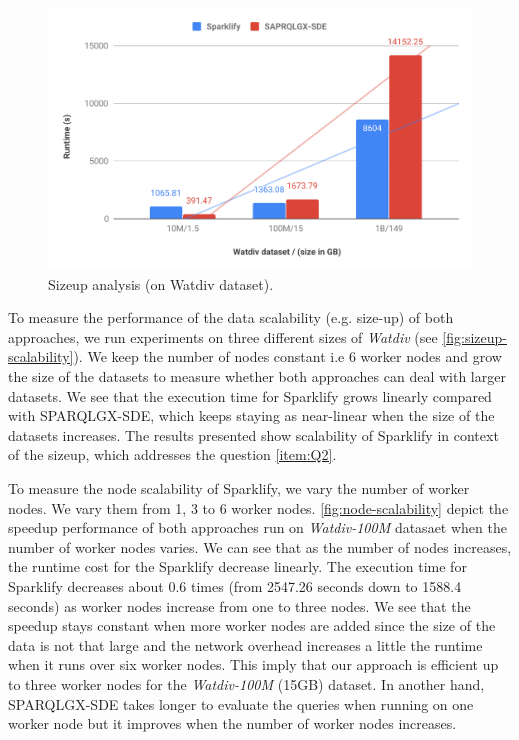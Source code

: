 \begin{figure}
 \includegraphics[width=1.0\columnwidth]{images/sizeup-scalability.pdf}
    \caption{Sizeup analysis (on Watdiv dataset).}
    \label{fig:sizeup-scalability}
\end{figure}

To measure the performance of the data scalability (e.g. size-up) of both approaches, we run experiments on three different sizes of \textit{Watdiv} (see \autoref{fig:sizeup-scalability}).
We keep the number of nodes constant i.e 6 worker nodes and grow the size of the datasets to measure whether both approaches can deal with larger datasets.
We see that the execution time for Sparklify grows linearly compared with SPARQLGX-SDE, which keeps staying as near-linear when the size of the datasets increases.
The results presented show scalability of Sparklify in context of the sizeup, which addresses the question \ref{item:Q2}.

To measure the node scalability of Sparklify, we vary the number of worker nodes.
We vary them from 1, 3 to 6 worker nodes.
\autoref{fig:node-scalability} depict the speedup performance of both approaches run on \textit{Watdiv-100M} datasaet when the number of worker nodes varies.
We can see that as the number of nodes increases, the runtime cost for the Sparklify decrease linearly.
The execution time for Sparklify decreases about 0.6 times (from 2547.26 seconds down to 1588.4 seconds) as worker nodes increase from one to three nodes.
We see that the speedup stays constant when more worker nodes are added since the size of the data is not that large and the network overhead increases a little the runtime when it runs over six worker nodes.
This imply that our approach is efficient up to three worker nodes for the \textit{Watdiv-100M} (15GB) dataset.
In another hand, SPARQLGX-SDE takes longer to evaluate the queries when running on one worker node but it improves when the number of worker nodes increases.

